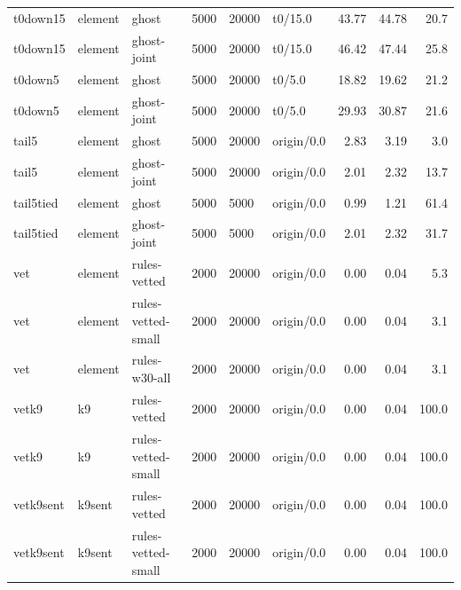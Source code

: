 \begin{table}[!htbp]
\begin{tabular}{@{}llllllrrr@{}}
t0down15 & element & ghost & 5000 & 20000 & t0/15.0 & 43.77 & 44.78 & 20.7 \\
t0down15 & element & ghost-joint & 5000 & 20000 & t0/15.0 & 46.42 & 47.44 & 25.8 \\
t0down5 & element & ghost & 5000 & 20000 & t0/5.0 & 18.82 & 19.62 & 21.2 \\
t0down5 & element & ghost-joint & 5000 & 20000 & t0/5.0 & 29.93 & 30.87 & 21.6 \\
tail5 & element & ghost & 5000 & 20000 & origin/0.0 & 2.83 & 3.19 & 3.0 \\
tail5 & element & ghost-joint & 5000 & 20000 & origin/0.0 & 2.01 & 2.32 & 13.7 \\
tail5tied & element & ghost & 5000 & 5000 & origin/0.0 & 0.99 & 1.21 & 61.4 \\
tail5tied & element & ghost-joint & 5000 & 5000 & origin/0.0 & 2.01 & 2.32 & 31.7 \\
vet & element & rules-vetted & 2000 & 20000 & origin/0.0 & 0.00 & 0.04 & 5.3 \\
vet & element & rules-vetted-small & 2000 & 20000 & origin/0.0 & 0.00 & 0.04 & 3.1 \\
vet & element & rules-w30-all & 2000 & 20000 & origin/0.0 & 0.00 & 0.04 & 3.1 \\
vetk9 & k9 & rules-vetted & 2000 & 20000 & origin/0.0 & 0.00 & 0.04 & 100.0 \\
vetk9 & k9 & rules-vetted-small & 2000 & 20000 & origin/0.0 & 0.00 & 0.04 & 100.0 \\
vetk9sent & k9sent & rules-vetted & 2000 & 20000 & origin/0.0 & 0.00 & 0.04 & 100.0 \\
vetk9sent & k9sent & rules-vetted-small & 2000 & 20000 & origin/0.0 & 0.00 & 0.04 & 100.0 \\
\bottomrule
\end{tabular}
\end{table}
